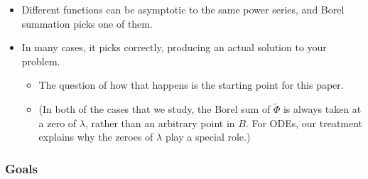 \documentclass{article}
\begin{document}
\begin{itemize}
\item Different functions can be asymptotic to the same power series, and Borel summation picks one of them.
\item In many cases, it picks correctly, producing an actual solution to your problem.
\begin{itemize}
\item The question of how that happens is the starting point for this paper.
\item (In both of the cases that we study, the Borel sum of $\tilde{\Phi}$ is always taken at a zero of $\lambda$, rather than an arbitrary point in $B$. For ODEs, our treatment explains why the zeroes of $\lambda$ play a special role.)
\end{itemize}
\end{itemize}
\subsubsection{Goals}
\end{document}
